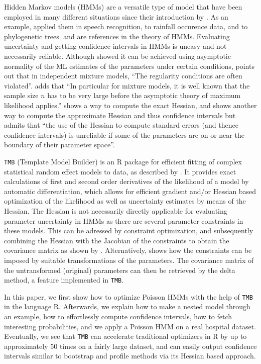 \documentclass[bimj,fleqn]{w-art}\usepackage[]{graphicx}\usepackage[]{color}
\theoremstyle{plain}
\theoremstyle{definition}
\begin{document}
Hidden Markov models (HMMs) are a versatile type of model that have been employed in many different situations since their introduction by \citet{baum}.
As an example, \citet{fredkin} applied them in speech recognition, \citet{lystig} to rainfall occurence data, and \citet{schadt} to phylogenetic trees.
\citet{fredkin} and \citet{zucchini} are references in the theory of HMMs.
Evaluating uncertainty and getting confidence intervals in HMMs is uneasy and not necessarily reliable.
Although \citet[][Ch.~12]{cappe} showed it can be achieved using asymptotic normality of the ML estimates of the parameters under certain conditions, \citet[p. ~53]{fruhwirth-schnatter} points out that in independent mixture models, ``The regularity conditions are often violated''.
\citet[p. ~68]{mclachlan} adds that ``In particular for mixture models, it is well known that the sample size $n$ has to be very large before the asymptotic theory of maximum likelihood applies.''
\citet{lystig} shows a way to compute the exact Hessian, and \citet{zucchini} shows another way to compute the approximate Hessian and thus confidence intervals but admits that ``the use of the Hessian to compute standard errors (and thence confidence intervals) is unreliable if some of the parameters are on or near the boundary of their parameter space''.

{\tt{TMB}} (Template Model Builder) is an R package for efficient fitting of complex statistical random effect models to data, as described by \citet{kristensen}.
It provides exact calculations of first and second order derivatives of the likelihood of a model by automatic differentiation, which allows for efficient gradient and/or Hessian based optimization of the likelihood as well as uncertainty estimates by means of the Hessian.
The Hessian is not necessarily directly applicable for evaluating parameter uncertainty in HMMs as there are several parameter constraints in these models.
This can be adressed by constraint optimization, and subsequently combining the Hessian with the Jacobian of the constraints to obtain the covariance matrix as shown by \citet{visser}.
Alternatively, \citet{zucchini} shows how the constraints can be imposed by suitable transformations of the parameters.
The covariance matrix of the untransformed (original) parameters can then be retrieved by the delta method, a feature implemented in {\tt{TMB}}.

In this paper, we first show how to optimize Poisson HMMs with the help of {\tt{TMB}} in the language R.
Afterwards, we explain how to make a nested model through an example, how to effortlessly compute confidence intervals, how to fetch interesting probabilities, and we apply a Poisson HMM on a real hospital dataset.
Eventually, we see that {\tt{TMB}} can accelerate traditional optimizers in R by up to approximately 50 times on a fairly large dataset, and can easily output confidence intervals similar to bootstrap and profile methods via its Hessian based approach.
\end{document}
